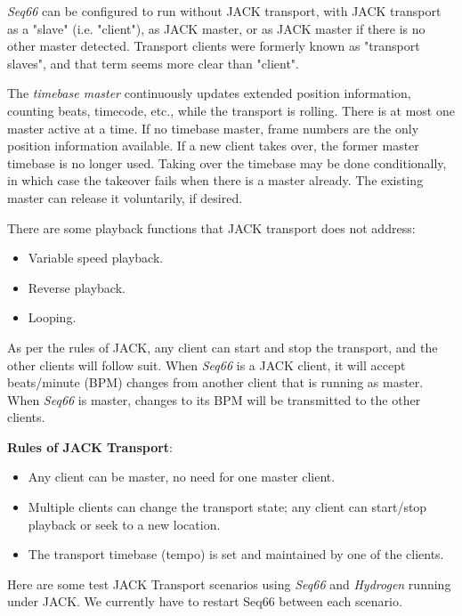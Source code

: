    \textsl{Seq66} can be configured to run without JACK transport, with JACK
   transport as a "slave" (i.e. "client"), as JACK master, or as JACK master if
   there is no other master detected.
   Transport clients were formerly known as "transport slaves", and that
   term seems more clear than "client".

   The \textsl{timebase master}
   continuously updates extended position information, counting beats,
   timecode, etc., while the transport is rolling.
   There is at most one master active at a time. If no
   timebase master, frame numbers are the only position information available.
   If a new client takes over, the former master timebase is no longer used.
   Taking over the timebase may be done conditionally, in which case the takeover
   fails when there is a master already. The existing master can release it
   voluntarily, if desired.

   There are some playback functions that JACK transport does not address:

   \begin{itemize}
      \item Variable speed playback.
      \item Reverse playback.
      \item Looping.
   \end{itemize}

   As per the rules of JACK, any client can start and stop the transport, and
   the other clients will follow suit.  When \textsl{Seq66} is a JACK client,
   it will accept beats/minute (BPM) changes from another client that is
   running as master.  When \textsl{Seq66} is master, changes to its BPM will
   be transmitted to the other clients.

   \textbf{Rules of JACK Transport}:

   \begin{itemize}
      \item Any client can be master, no need for one master client.
      \item Multiple clients can change the transport state;
         any client can start/stop playback or seek to a new location.
      \item The transport timebase (tempo) is set and maintained by
         one of the clients.
   \end{itemize}

   Here are some test JACK Transport scenarios using
   \textsl{Seq66} and \textsl{Hydrogen} running under JACK.
   We currently have to restart Seq66 between each scenario.

